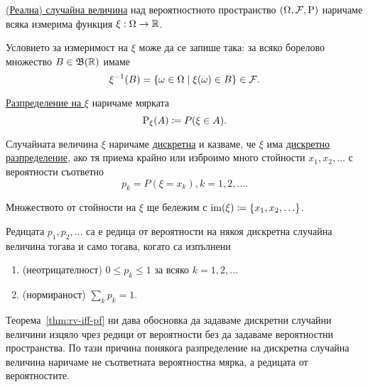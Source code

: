 \documentclass[numbers=endperiod, DIV=15, bibliography=totocnumbered]{scrartcl}
\begin{document}
\begin{definition}
  \underline{(Реална) случайна величина} над вероятностното пространство $(\Omega, \mathcal{F}, \operatorname{P})$ наричаме всяка измерима функция $\xi : \Omega \to \mathbb{R}$.

  Условието за измеримост на $\xi$ може да се запише така: за всяко борелово множество $B \in \mathfrak{B}(\mathbb{R})$ имаме
  \begin{displaymath}
    \xi^{-1} (B) = \{ \omega \in \Omega \mid \xi(\omega) \in B \} \in \mathcal{F}.
  \end{displaymath}

  \underline{Разпределение на $\xi$} наричаме мярката
  \begin{displaymath}
    \operatorname{P}_\xi(A) \coloneqq P(\xi \in A).
  \end{displaymath}

  Случайната величина $\xi$ наричаме \underline{дискретна} и казваме, че $\xi$ има \underline{дискретно разпределение}, ако тя приема крайно или изброимо много стойности $x_1, x_2, \ldots$ с вероятности съответно
  \begin{displaymath}
    p_k = P(\xi = x_k), k = 1, 2, \ldots.
  \end{displaymath}

  Множеството от стойности на $\xi$ ще бележим с $\operatorname{im}(\xi) \coloneqq \{ x_1, x_2, \ldots \}$.
\end{definition}

\begin{theorem}\label{thm:rv-iff-pf}
  Редицата $p_1, p_2, \ldots$ са е редица от вероятности на някоя дискретна случайна величина тогава и само тогава, когато са изпълнени
  \begin{enumerate}
    \item\label{thm:rv-iff-pf.bounded} (неотрицателност) $0 \leq p_k \leq 1$ за всяко $k = 1, 2, \ldots$
    \item\label{thm:rv-iff-pf.normed} (нормираност) $\sum_k p_k = 1$.
  \end{enumerate}
\end{theorem}

Теорема~\ref{thm:rv-iff-pf} ни дава обосновка да задаваме дискретни случайни величини изцяло чрез редици от вероятности без да задаваме вероятностни пространства. По тази причина понякога разпределение на дискретна случайна величина наричаме не съответната вероятностна мярка, а редицата от вероятностите.
\end{document}
